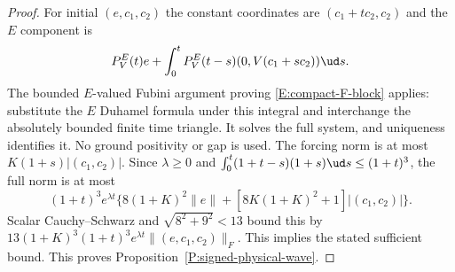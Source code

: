 \begin{proof}
  For initial $(e,c_1,c_2)$ the constant coordinates are
  $(c_1+tc_2,c_2)$ and the $E$ component is
  \[
    P_V^E(t)e+\int_0^t P_V^E(t-s)(0,V(c_1+sc_2))\ud s .
  \]
  The bounded $E$-valued Fubini argument proving
  \eqref{E:compact-F-block} applies: substitute the $E$ Duhamel
  formula under this integral and interchange the absolutely
  bounded finite time triangle. It solves the full system,
  and uniqueness identifies it. No ground positivity or gap is used.
  The forcing norm is at most $K(1+s)|(c_1,c_2)|$.
  Since $\lambda\ge0$ and
  $\int_0^t(1+t-s)(1+s)\ud s\le(1+t)^3$, the full norm is at most
  \[
    (1+t)^3e^{\lambda t}
    \{8(1+K)^2\|e\|+[8K(1+K)^2+1]|(c_1,c_2)|\}.
  \]
  Scalar Cauchy--Schwarz and $\sqrt{8^2+9^2}<13$ bound this
  by $13(1+K)^3(1+t)^3e^{\lambda t}\|(e,c_1,c_2)\|_F$.
  This implies the stated sufficient bound.
  This proves Proposition~\ref{P:signed-physical-wave}.
\end{proof}
